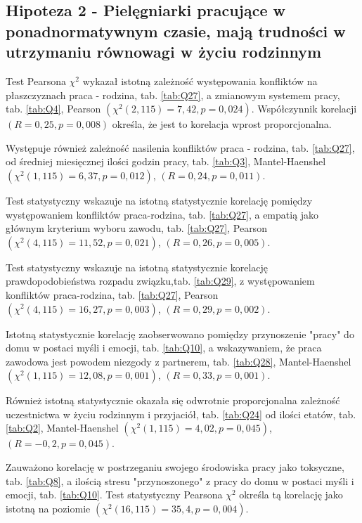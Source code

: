 \documentclass[a4paper,12pt,twoside,openright]{mwrep}
\begin{document}
\subsection*{Hipoteza 2 - Pielęgniarki pracujące w ponadnormatywnym czasie,  mają  trudności w utrzymaniu równowagi w życiu  rodzinnym }



	Test Pearsona $\chi^2$ wykazał istotną zależność występowania konfliktów na płaszczyznach praca - rodzina, tab. \ref{tab:Q27}, a zmianowym systemem pracy, tab. \ref{tab:Q4}, Pearson $(\chi^2 (2, 115) = 7,42, p = 0,024)$. Współczynnik korelacji $(R = 0,25, p = 0,008)$ określa, że jest to korelacja wprost proporcjonalna.
	

	Występuje również zależność nasilenia konfliktów praca - rodzina, tab. \ref{tab:Q27}, od średniej miesięcznej ilości godzin pracy, tab. \ref{tab:Q3}, 
Mantel-Haenshel $(\chi^2 (1, 115) = 6,37, p=0,012)$, $(R = 0,24, p = 0,011)$.

	Test statystyczny wskazuje na istotną statystycznie korelację pomiędzy występowaniem konfliktów praca-rodzina, tab. \ref{tab:Q27}, a empatią jako głównym kryterium wyboru zawodu, tab. \ref{tab:Q27}, Pearson $(\chi^2 (4, 115) = 11,52, p=0,021)$, $(R = 0,26, p = 0,005)$.

	Test statystyczny wskazuje na istotną statystycznie korelację prawdopodobieństwa rozpadu związku,tab. \ref{tab:Q29}, z występowaniem konfliktów praca-rodzina, tab. \ref{tab:Q27}, Pearson $(\chi^2 (4, 115) = 16,27, p=0,003)$, $(R = 0,29, p = 0,002)$.
	
	Istotną statystycznie korelację zaobserwowano pomiędzy przynoszenie "pracy" do domu w postaci myśli i emocji, tab. \ref{tab:Q10}, a wskazywaniem, że praca zawodowa jest powodem niezgody z partnerem, tab. \ref{tab:Q28}, Mantel-Haenshel $(\chi^2 (1, 115) = 12,08, p=0,001)$, $(R = 0,33, p = 0,001)$.

Również istotną statystycznie okazała się odwrotnie proporcjonalna zależność uczestnictwa w życiu rodzinnym i przyjaciół, tab. \ref{tab:Q24} od ilości etatów, tab. \ref{tab:Q2}, Mantel-Haenshel $(\chi^2 (1, 115) = 4,02, p=0,045)$, $(R = -0,2, p = 0,045)$. 
	

Zauważono korelację w postrzeganiu swojego środowiska pracy jako toksyczne, tab. \ref{tab:Q8}, a ilością stresu "przynoszonego" z pracy do domu w postaci myśli i emocji, tab. \ref{tab:Q10}. Test statystyczny Pearsona $\chi^2$ określa tą korelację jako istotną na poziomie $(\chi^2 (16, 115) = 35,4, p = 0,004)$.
\end{document}
